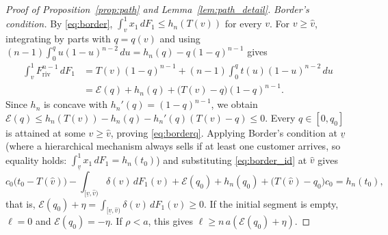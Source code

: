 \documentclass[12pt]{article}
\theoremstyle{mystyle}
\theoremstyle{mystyle2}
\newcommand{\1}{\mathbf{1}}
\begin{document}
\begin{proof}[Proof of Proposition~\ref{prop:path} and Lemma~\ref{lem:path_detail}]
\emph{Border's condition.} By \eqref{eq:border}, $\int_v^1 x_1\,dF_1\le h_n(T(v))$ for every $v$. For $v\ge\hat v$, integrating by parts with $q=q(v)$ and using $(n-1)\int_0^q u(1-u)^{n-2}\,du=h_n(q)-q(1-q)^{n-1}$ gives
\begin{equation}\label{eq:border_id}
\begin{aligned}
\int_v^1 F_{\mathrm{riv}}^{n-1}\,dF_1
&= T(v)(1-q)^{n-1} + (n-1)\int_0^q t(u)(1-u)^{n-2}\,du \\
&= \mathcal E(q) + h_n(q) + \bigl(T(v)-q\bigr)(1-q)^{n-1}.
\end{aligned}
\end{equation}
Since $h_n$ is concave with $h_n'(q)=(1-q)^{n-1}$, we obtain $\mathcal E(q)\le h_n(T(v))-h_n(q)-h_n'(q)(T(v)-q)\le 0$. Every $q\in[0,q_0]$ is attained at some $v\ge\hat v$, proving \eqref{eq:borderq}. Applying Border's condition at $\underline v$ (where a hierarchical mechanism always sells if at least one customer arrives, so equality holds: $\int_{\underline v}^1 x_1\,dF_1=h_n(t_0)$) and substituting \eqref{eq:border_id} at $\hat v$ gives
\[
c_0\bigl(t_0-T(\hat v)\bigr) - \int_{[\underline v,\hat v)} \delta(v)\,dF_1(v) + \mathcal E(q_0) + h_n(q_0) + \bigl(T(\hat v)-q_0\bigr)c_0 = h_n(t_0),
\]
that is, $\mathcal E(q_0)+\eta=\int_{[\underline v,\hat v)} \delta(v)\,dF_1(v)\ge 0$. If the initial segment is empty, $\ell=0$ and $\mathcal E(q_0)=-\eta$. If $\rho<a$, this gives $\ell\ge n\,a(\mathcal E(q_0)+\eta)$.
\end{proof}
\end{document}
